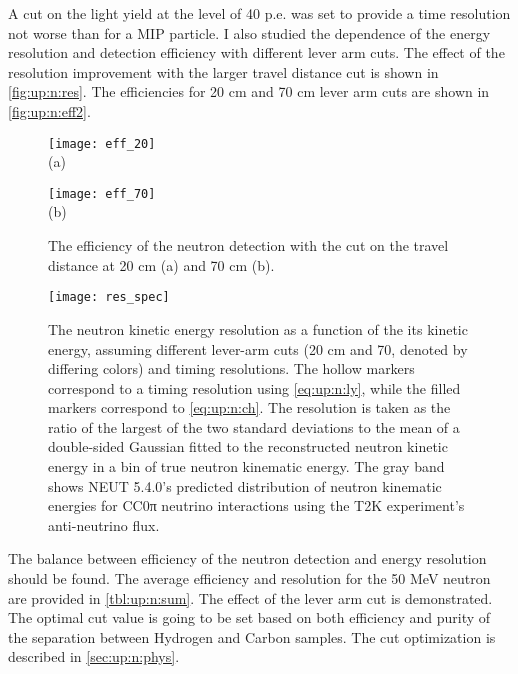 \documentclass[main.tex]{subfiles}
\begin{document}
A cut on the light yield at the level of 40 p.e. was set to provide a time resolution not worse than for a MIP particle. I also studied the dependence of the energy resolution and detection efficiency with different lever arm cuts. The effect of the resolution improvement with the larger travel distance cut is shown in \autoref{fig:up:n:res}. The efficiencies for 20 cm and 70 cm lever arm cuts are shown in \autoref{fig:up:n:eff2}.

\begin{figure}[!ht]
	\centering
	\begin{minipage}{0.49\linewidth}
		\centering
		\texttt{[image: eff\_20]} \\ (a)
	\end{minipage}
	\begin{minipage}{0.49\linewidth}
		\centering
		\texttt{[image: eff\_70]} \\ (b)
	\end{minipage}
	\caption{The efficiency of the neutron detection with the cut on the travel distance at 20 cm (a) and 70 cm (b).}
	\label{fig:up:n:eff2}
\end{figure}

\begin{figure}[!ht]
	\centering
	\texttt{[image: res\_spec]}
	\caption{The neutron kinetic energy resolution as a function of the its kinetic energy, assuming different lever-arm cuts (20 cm and 70, denoted by differing colors) and timing resolutions. The hollow markers correspond to a timing resolution using \autoref{eq:up:n:ly}, while the filled markers correspond to \autoref{eq:up:n:ch}. The resolution is taken as the ratio of the largest of the two standard deviations to the mean of a double-sided Gaussian fitted to the reconstructed neutron kinetic energy in a bin of true neutron kinematic energy. The gray band shows NEUT 5.4.0’s predicted distribution of neutron kinematic energies for CC0π neutrino interactions using the T2K experiment’s anti-neutrino flux.}
	\label{fig:up:n:res}
\end{figure}

The balance between efficiency of the neutron detection and energy resolution should be found. The average efficiency and resolution for the 50 MeV neutron are provided in \autoref{tbl:up:n:sum}. The effect of the lever arm cut is demonstrated. The optimal cut value is going to be set based on both efficiency and purity of the separation between Hydrogen and Carbon samples. The cut optimization is described in \autoref{sec:up:n:phys}.
\end{document}
